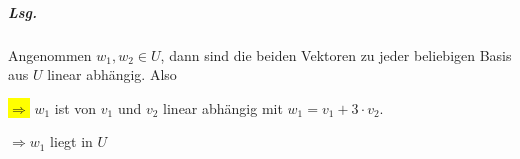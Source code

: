 \documentclass{scrreprt}
\begin{document}
\begin{enumerate}[(a)]
  \subparagraph{Lsg.} Angenommen $w_1, w_2 \in U$, dann sind die beiden Vektoren
  zu jeder beliebigen Basis aus $U$ linear abhängig.
  Also

  \colorbox{yellow}{$\Rightarrow$} $w_1$ ist von $v_1$ und $v_2$ linear
  abhängig mit $w_1 = v_1 + 3 \cdot v_2$.

  $\Rightarrow w_1$ liegt in $U$


\end{enumerate}
\end{document}
